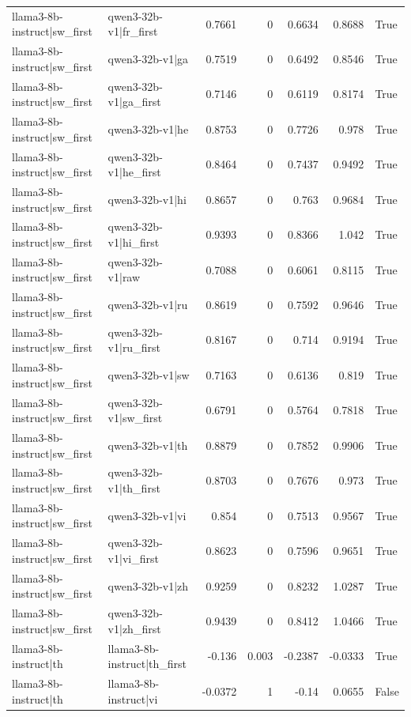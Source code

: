 \begin{table}
\begin{tabular}{l l r r r r l}
llama3-8b-instruct|sw_first & qwen3-32b-v1|fr_first & 0.7661 & 0 & 0.6634 & 0.8688 & True \\
llama3-8b-instruct|sw_first & qwen3-32b-v1|ga & 0.7519 & 0 & 0.6492 & 0.8546 & True \\
llama3-8b-instruct|sw_first & qwen3-32b-v1|ga_first & 0.7146 & 0 & 0.6119 & 0.8174 & True \\
llama3-8b-instruct|sw_first & qwen3-32b-v1|he & 0.8753 & 0 & 0.7726 & 0.978 & True \\
llama3-8b-instruct|sw_first & qwen3-32b-v1|he_first & 0.8464 & 0 & 0.7437 & 0.9492 & True \\
llama3-8b-instruct|sw_first & qwen3-32b-v1|hi & 0.8657 & 0 & 0.763 & 0.9684 & True \\
llama3-8b-instruct|sw_first & qwen3-32b-v1|hi_first & 0.9393 & 0 & 0.8366 & 1.042 & True \\
llama3-8b-instruct|sw_first & qwen3-32b-v1|raw & 0.7088 & 0 & 0.6061 & 0.8115 & True \\
llama3-8b-instruct|sw_first & qwen3-32b-v1|ru & 0.8619 & 0 & 0.7592 & 0.9646 & True \\
llama3-8b-instruct|sw_first & qwen3-32b-v1|ru_first & 0.8167 & 0 & 0.714 & 0.9194 & True \\
llama3-8b-instruct|sw_first & qwen3-32b-v1|sw & 0.7163 & 0 & 0.6136 & 0.819 & True \\
llama3-8b-instruct|sw_first & qwen3-32b-v1|sw_first & 0.6791 & 0 & 0.5764 & 0.7818 & True \\
llama3-8b-instruct|sw_first & qwen3-32b-v1|th & 0.8879 & 0 & 0.7852 & 0.9906 & True \\
llama3-8b-instruct|sw_first & qwen3-32b-v1|th_first & 0.8703 & 0 & 0.7676 & 0.973 & True \\
llama3-8b-instruct|sw_first & qwen3-32b-v1|vi & 0.854 & 0 & 0.7513 & 0.9567 & True \\
llama3-8b-instruct|sw_first & qwen3-32b-v1|vi_first & 0.8623 & 0 & 0.7596 & 0.9651 & True \\
llama3-8b-instruct|sw_first & qwen3-32b-v1|zh & 0.9259 & 0 & 0.8232 & 1.0287 & True \\
llama3-8b-instruct|sw_first & qwen3-32b-v1|zh_first & 0.9439 & 0 & 0.8412 & 1.0466 & True \\
llama3-8b-instruct|th & llama3-8b-instruct|th_first & -0.136 & 0.003 & -0.2387 & -0.0333 & True \\
llama3-8b-instruct|th & llama3-8b-instruct|vi & -0.0372 & 1 & -0.14 & 0.0655 & False \\

\end{tabular}
\end{table}
